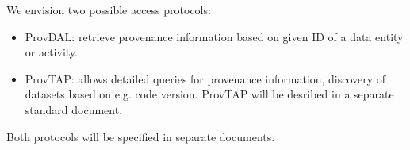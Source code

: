 \label{sec:access_protocols}
We envision two possible access protocols:
\begin{itemize}
\item ProvDAL: retrieve provenance information based on given ID of a data entity or activity.
\item ProvTAP: allows detailed queries for provenance information, discovery of datasets based on e.g. code version. ProvTAP will be desribed in a separate standard document.
\end{itemize}

Both protocols will be specified in separate documents.

%




